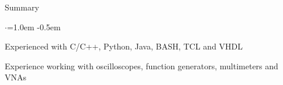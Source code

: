 \documentclass{resume} %
\begin{document}
	
	
	\begin{rSection}{Summary}
		\vspace {0.5em}
		\begin{list}{$\cdot$}{\leftmargin=1.0em}
			\itemsep -0.5em \vspace{-0.5em}
			\item Experienced with C/C++, Python, Java, BASH, TCL and VHDL			
			\item Experience working with oscilloscopes, function generators, multimeters and VNAs
		\end{list}
		\vspace{0.5em}
	\end{rSection}
	
	
\end{document}
